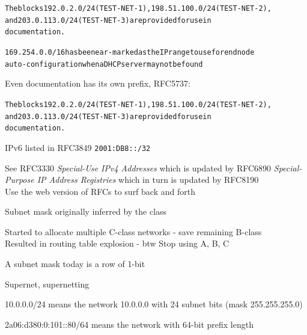 \documentclass[Screen16to9,17pt]{foils}
\begin{document}
\begin{alltt}
The blocks 192.0.2.0/24 (TEST-NET-1), 198.51.100.0/24 (TEST-NET-2),
and 203.0.113.0/24 (TEST-NET-3) are provided for use in
documentation.

169.254.0.0/16 has been ear-marked as the IP range to use for end node
auto-configuration when a DHCP server may not be found
\end{alltt}



Even documentation has its own prefix, RFC5737:
\begin{alltt}
The blocks 192.0.2.0/24 (TEST-NET-1), 198.51.100.0/24 (TEST-NET-2),
and 203.0.113.0/24 (TEST-NET-3) are provided for use in
documentation.
\end{alltt}

IPv6 listed in RFC3849 \verb+2001:DB8::/32+

See RFC3330 \emph{Special-Use IPv4 Addresses} which is updated by
RFC6890 \emph{Special-Purpose IP Address Registries} which in turn is updated by RFC8190\\
Use the web version of RFCs to surf back and forth 




\begin{list2}
\item Subnet mask originally inferred by the class
\item Started to allocate multiple C-class networks - save remaining B-class\\
Resulted in routing table explosion - btw Stop using A, B, C
\item A subnet mask today is a row of 1-bit
\item Supernet, supernetting
\item 10.0.0.0/24 means the network 10.0.0.0 with 24 subnet bits (mask 255.255.255.0)
\item 2a06:d380:0:101::80/64 means the network with 64-bit prefix length
\end{list2}







\end{document}
